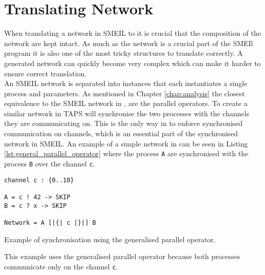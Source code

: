 \section{Translating Network}
\label{sec:design_translating_network}
When translating a network in SMEIL to \cspm{} it is crucial that the composition of the network are kept intact. As much as the network is a crucial part of the SMEIl program it is also one of the most tricky structures to translate correctly. A generated network can quickly become very complex which can make it harder to ensure correct translation. \\

An SMEIL network is separated into instances that each instantiates a single process and parameters. As mentioned in Chapter \ref{chap:analysis} the closest equivalence to the SMEIL network in \cspm{}, are the parallel operators. To create a similar network in \cspm{} TAPS will synchronise the two processes with the channels they are communicating on.
This is the only way in \cspm{} to enforce synchronised communication on channels, which is an essential part of the synchronised network in SMEIL. An example of a simple network in \cspm{} can be seen in Listing \ref{lst:general_parallel_operator} where the process \texttt{A} are synchronised with the process \texttt{B} over the channel \texttt{c}.
\begin{listing}
\begin{verbatim}
channel c : {0..10}

A = c ! 42 -> SKIP
B = c ? x -> SKIP

Network = A [|{| c |}|] B
\end{verbatim}
\caption{Example of synchronisation using the generalised parallel operator.}
\label{lst:general_parallel_operator}
\end{listing}
This example uses the generalised parallel operator because both processes communicate only on the channel \texttt{c}.

